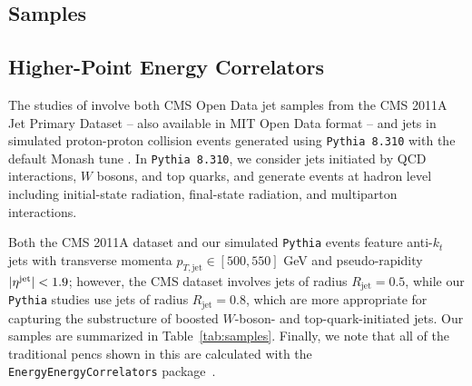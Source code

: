 \begin{subappendices}

\section{Samples}
\label{app:energyweight-samples}

\subsection{Higher-Point Energy Correlators}
The studies of  involve both CMS Open Data jet samples from the CMS 2011A Jet Primary Dataset \cite{CERNOpenDataPortal, CMS:JetPrimary2011A} -- also available in MIT Open Data format \cite{Komiske:2019jim, komiske_patrick_2019_3340205} -- and jets in simulated proton-proton collision events generated using \texttt{Pythia 8.310} \cite{Bierlich:2022pfr} with the default Monash tune \cite{Skands:2014pea}.
%
In \texttt{Pythia 8.310}, we consider jets initiated by QCD interactions, \(W\) bosons, and top quarks, and generate events at hadron level including initial-state radiation, final-state radiation, and multiparton interactions.

Both the CMS 2011A dataset and our simulated \texttt{Pythia} events feature anti-$k_t$ jets \cite{Cacciari:2008gp} with transverse momenta $p_{T,\text{jet}} \in [500, 550]$ GeV and pseudo-rapidity $\vert \eta^{\rm jet} \vert < 1.9$;
%
however, the CMS dataset involves jets of radius \(R_\text{jet}=0.5\), while our \texttt{Pythia} studies use jets of radius \(R_\text{jet} = 0.8\), which are more appropriate for capturing the substructure of boosted $W$-boson- and top-quark-initiated jets.
%
Our samples are summarized in Table~\ref{tab:samples}.
%
Finally, we note that all of the traditional \glspl{penc} shown in this  are calculated with the \texttt{EnergyEnergyCorrelators} package~\cite{EEC_github}.


\end{subappendices}
